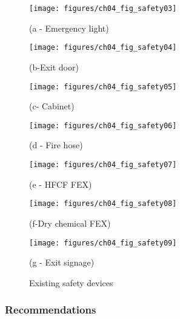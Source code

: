\begin{figure}[!h]
	
	\begin{minipage}[b]{0.22\linewidth}
		\centering
		\texttt{[image: figures/ch04\_fig\_safety03]}
		\caption*{(a - Emergency light)}
	\end{minipage}
	\hspace{0.03cm}
	\begin{minipage}[b]{0.22\linewidth}
		\centering
		\texttt{[image: figures/ch04\_fig\_safety04]}
		\caption*{(b-Exit door)}
	\end{minipage}
	\hspace{0.03cm}
	\begin{minipage}[b]{0.22\linewidth}
		\centering
		\texttt{[image: figures/ch04\_fig\_safety05]}
		\caption*{(c- Cabinet)}
	\end{minipage}
	\hspace{0.03cm}
	\begin{minipage}[b]{0.22\linewidth}
		\centering
		\texttt{[image: figures/ch04\_fig\_safety06]}
		\caption*{(d - Fire hose)}
	\end{minipage}
	\hspace{0.03cm}
	\begin{minipage}[b]{0.22\linewidth}
		\centering
		\texttt{[image: figures/ch04\_fig\_safety07]}
		\caption*{(e - HFCF FEX)}
	\end{minipage}
	\hspace{0.03cm}
	\begin{minipage}[b]{0.22\linewidth}
		\centering
		\texttt{[image: figures/ch04\_fig\_safety08]}
		\caption*{(f-Dry chemical FEX)}
	\end{minipage}
	\hspace{0.03cm}
	\begin{minipage}[b]{0.5\linewidth}
		\centering
		\texttt{[image: figures/ch04\_fig\_safety09]}
		\caption*{(g - Exit signage)}
	\end{minipage}
	\caption{Existing safety devices}
	\label{ch04_fig_safety02}
\end{figure}


\subsubsection{Recommendations}

